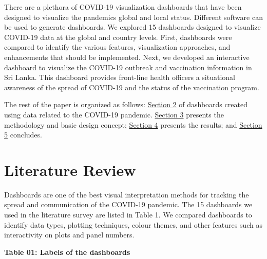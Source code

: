 \documentclass[
]{article}
\begin{document}
There are a plethora of COVID-19 visualization dashboards that have been
designed to visualize the pandemics global and local status. Different
software can be used to generate dashboards. We explored 15 dashboards
designed to visualize COVID-19 data at the global and country levels.
First, dashboards were compared to identify the various features,
visualization approaches, and enhancements that should be implemented.
Next, we developed an interactive dashboard to visualize the COVID-19
outbreak and vaccination information in Sri Lanka. This dashboard
provides front-line health officers a situational awareness of the
spread of COVID-19 and the status of the vaccination program.

The rest of the paper is organized as follows:
\protect\hyperlink{litreview}{Section 2} of dashboards created using
data related to the COVID-19 pandemic.
\protect\hyperlink{methods}{Section 3} presents the methodology and
basic design concept; \protect\hyperlink{results}{Section 4} presents
the results; and \protect\hyperlink{ux5cux2520conclusion}{Section 5}
concludes.

\hypertarget{litreview}{%
\section{Literature Review}\label{litreview}}

Dashboards are one of the best visual interpretation methods for
tracking the spread and communication of the COVID-19 pandemic. The 15
dashboards we used in the literature survey are listed in Table 1. We
compared dashboards to identify data types, plotting techniques, colour
themes, and other features such as interactivity on plots and panel
numbers.

\textbf{Table 01: Labels of the dashboards}
\end{document}
